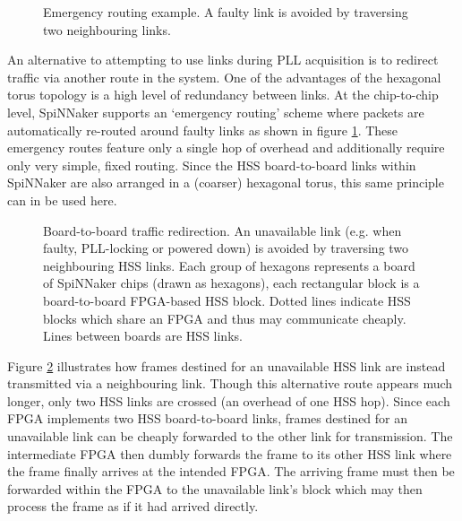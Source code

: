 			\begin{figure}
				\center
				
				
				\caption[Emergency routing example.]{Emergency routing example. A
				faulty link is avoided by traversing two neighbouring links.}
				\label{fig:emergency-routing}
			\end{figure}
			
			An alternative to attempting to use links during PLL acquisition is to
			redirect traffic via another route in the system. One of the advantages of
			the hexagonal torus topology is a high level of redundancy between links.
			At the chip-to-chip level, SpiNNaker supports an `emergency routing'
			scheme where packets are automatically re-routed around faulty links as
			shown in figure \ref{fig:emergency-routing}. These emergency routes
			feature only a single hop of overhead and additionally require only very
			simple, fixed routing. Since the HSS board-to-board links within SpiNNaker
			are also arranged in a (coarser) hexagonal torus, this same principle can
			in be used here.
			
			\begin{figure}
				\center
				
				
				\caption[Board-to-board traffic redirection.]{Board-to-board traffic
				redirection. An unavailable link (e.g. when faulty, PLL-locking or
				powered down) is avoided by traversing two neighbouring HSS links. Each
				group of hexagons represents a board of SpiNNaker chips (drawn as
				hexagons), each rectangular block is a board-to-board FPGA-based HSS
				block. Dotted lines indicate HSS blocks which share an FPGA and thus may
				communicate cheaply. Lines between boards are HSS links.}
				\label{fig:board-to-board-redirection}
			\end{figure}
			
			Figure \ref{fig:board-to-board-redirection} illustrates how frames
			destined for an unavailable HSS link are instead transmitted via a
			neighbouring link.  Though this alternative route appears much longer,
			only two HSS links are crossed (an overhead of one HSS hop). Since each
			FPGA implements two HSS board-to-board links, frames destined for an
			unavailable link can be cheaply forwarded to the other link for
			transmission. The intermediate FPGA then dumbly forwards the frame to its
			other HSS link where the frame finally arrives at the intended FPGA. The
			arriving frame must then be forwarded within the FPGA to the unavailable
			link's block which may then process the frame as if it had arrived
			directly.
			
